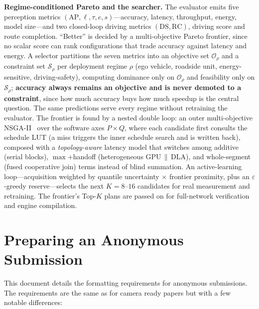 \documentclass[letterpaper]{article} %
\begin{document}
\noindent\textbf{Regime-conditioned Pareto and the searcher.}
The evaluator emits five perception metrics
$(\mathrm{AP},\ell,\tau,e,s)$---accuracy, latency, throughput, energy, model
size---and two closed-loop driving metrics $(\mathrm{DS},\mathrm{RC})$,
driving score and route completion. ``Better'' is decided by a
multi-objective Pareto frontier, since no scalar score can rank
configurations that trade accuracy against latency and energy. A selector
partitions the seven metrics into an objective set $\mathcal{O}_\rho$ and a
constraint set $\mathcal{S}_\rho$ per deployment regime $\rho$
(ego vehicle, roadside unit, energy-sensitive, driving-safety), computing
dominance only on $\mathcal{O}_\rho$ and feasibility only on
$\mathcal{S}_\rho$; \textbf{accuracy always remains an objective and is never
demoted to a constraint}, since how much accuracy buys how much speedup is
the central question. The same predictions serve every regime without
retraining the evaluator. The frontier is found by a nested double loop: an
outer multi-objective NSGA-II~\cite{deb2002nsga} over the software axes
$P\times Q$, where each candidate first consults the schedule LUT (a miss
triggers the inner schedule search and is written back), composed with a
\emph{topology-aware} latency model that switches among additive (serial
blocks), $\max$+handoff (heterogeneous GPU\,$\parallel$\,DLA), and
whole-segment (fused cooperative join) terms instead of blind summation. An
active-learning loop---acquisition weighted by quantile uncertainty
$\times$ frontier proximity, plus an $\varepsilon$-greedy reserve---selects
the next $K{=}8\text{--}16$ candidates for real measurement and retraining.
The frontier's Top-$K$ plans are passed on for full-network verification and
engine compilation.


\section{Preparing an Anonymous Submission}

This document details the formatting requirements for anonymous submissions. The requirements are the same as for camera ready papers but with a few notable differences:
\end{document}
